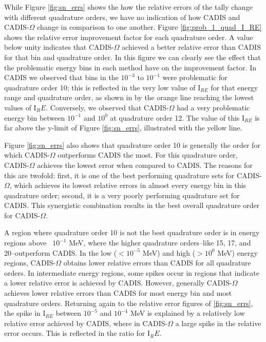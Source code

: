 While Figure \ref{fig:sn_errs} shows the how the relative errors of the tally
change with different quadrature orders, we have no indication of how CADIS and
CADIS-$\Omega$ change in comparison to one another. Figure
\ref{fig:prob_1_quad_I_RE} shows the relative error improvement factor for each
quadrature order. A value below unity indicates that CADIS-$\Omega$ achieved a
better relative error than CADIS for that bin and quadrature order. In this
figure we can clearly see the effect that the problematic energy bins in each
method have on the improvement factor. In CADIS we observed that bins in the
$10^{-3}$ to $10^{-1}$ were problematic for quadrature order 10; this is
reflected in the very low value of I$_{RE}$ for that energy range and quadrature
order, as shown in by the orange line reaching the lowest values of I$_RE$.
Conversely, we observed that CADIS-$\Omega$ had a very problematic energy
bin between $10^{-1}$ and $10^{0}$ at quadrature order 12. The value of this
I$_{RE}$ is far above the y-limit of Figure \ref{fig:sn_errs}, illustrated with
the yellow line.

Figure \ref{fig:sn_errs} also shows that quadrature order 10 is generally the order
for which CADIS-$\Omega$ outperforms CADIS the most. For this quadrature order,
CADIS-$\Omega$ achieves the lowest error when compared to CADIS. The reasons for
this are twofold: first, it is one of the best performing quadrature sets for
CADIS-$\Omega$, which achieves its lowest relative errors in almost every energy
bin in this quadrature order; second, it is a very poorly performing quadrature
set for CADIS. This synergistic combination results in the best overall
quadrature order for CADIS-$\Omega$.

A region where quadrature order 10 is not the best quadrature order is
in energy regions above ~$10^{-1}$ MeV, where the higher quadrature
orders--like 15, 17, and 20--outperform CADIS.
In the low ($<10^{-5}$ MeV) and high ($>10^{0}$ MeV) energy
regions,
CADIS-$\Omega$ obtains lower relative errors than CADIS for all quadrature
orders. In intermediate energy regions, some spikes occur in regions that
indicate a lower relative error is achieved by CADIS. However, generally
CADIS-$\Omega$ achieves lower relative errors than CADIS for most energy bin and
most quadrature orders. Returning again to the
relative error figures of \ref{fig:sn_errs}, the spike in I$_{RE}$ between
$10^{-5}$ and $10^{-4}$
MeV is explained by a relatively low relative error achieved by CADIS, where in
CADIS-$\Omega$ a large spike in the relative error occurs. This is reflected in
the ratio for I$_RE$.

